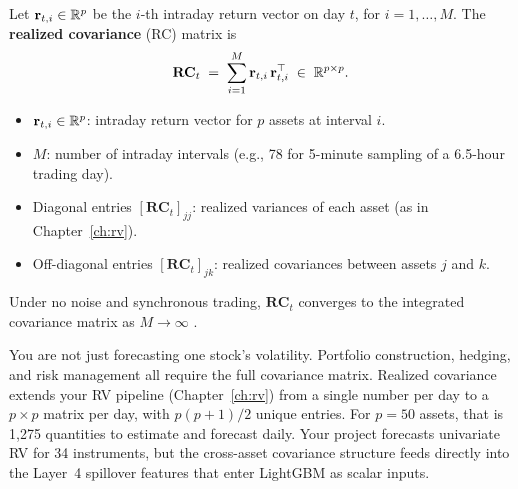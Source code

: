 \begin{definition}
Let $\mathbf{r}_{t,i} \in \mathbb{R}^p$ be the $i$-th intraday return vector on day $t$,
for $i = 1, \ldots, M$. The \textbf{realized covariance} (RC) matrix is
\begin{equation}\label{eq:rc}
  \mathbf{RC}_t \;=\; \sum_{i=1}^{M} \mathbf{r}_{t,i}\,\mathbf{r}_{t,i}^\top
  \;\in\; \mathbb{R}^{p \times p}.
\end{equation}
\begin{itemize}[nosep]
  \item $\mathbf{r}_{t,i} \in \mathbb{R}^p$: intraday return vector for $p$ assets at
        interval $i$.
  \item $M$: number of intraday intervals (e.g., 78 for 5-minute sampling of
        a 6.5-hour trading day).
  \item Diagonal entries $[\mathbf{RC}_t]_{jj}$: realized variances of each asset
        (as in Chapter~\ref{ch:rv}).
  \item Off-diagonal entries $[\mathbf{RC}_t]_{jk}$: realized covariances between
        assets $j$ and $k$.
\end{itemize}
Under no noise and synchronous trading, $\mathbf{RC}_t$ converges to the
integrated covariance matrix as $M \to \infty$
\citep{BarndorffNielsenHansenLundeShephard2011}.
\end{definition}

\begin{projectconnection}
You are not just forecasting one stock's volatility. Portfolio construction,
hedging, and risk management all require the full covariance matrix. Realized
covariance extends your RV pipeline (Chapter~\ref{ch:rv}) from a single number
per day to a $p \times p$ matrix per day, with $p(p+1)/2$ unique entries. For
$p = 50$ assets, that is 1{,}275 quantities to estimate and forecast daily.
Your project forecasts univariate RV for 34 instruments, but the cross-asset
covariance structure feeds directly into the Layer~4 spillover features that
enter LightGBM as scalar inputs.
\end{projectconnection}

